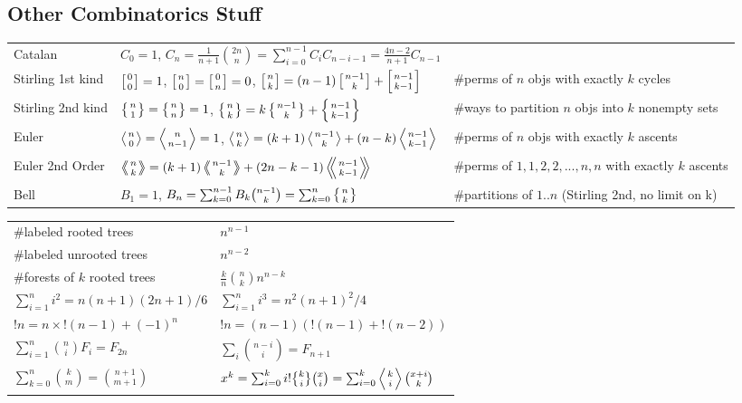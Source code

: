 \documentclass[8pt,a4paper,landscape,oneside]{amsart}
\DeclareRobustCommand{\stirling}{\genfrac\{\}{0pt}{}}
\begin{document}
\begin{multicols*}{3}
\section{Other Combinatorics Stuff}
  \begin{tabular}{@{}l|l|l@{}}
  \toprule
  Catalan	&	$C_0=1$, $C_n=\frac{1}{n+1}\binom{2n}{n} = \sum_{i=0}^{n-1}C_iC_{n-i-1} = \frac{4n-2}{n+1}C_{n-1}$  & \\
  Stirling 1st kind & $\left[{0\atop 0}\right]=1$, $\left[{n\atop 0}\right]=\left[{0\atop n}\right]=0$, $\left[{n\atop k}\right]=(n-1)\left[{n-1\atop k}\right]+\left[{n-1\atop k-1}\right]$ & \#perms of $n$ objs with exactly $k$ cycles\\
  Stirling 2nd kind & $\left\{{n\atop 1}\right\}=\left\{{n\atop n}\right\}=1$, $\left\{{n\atop k}\right\} = k \left\{{ n-1 \atop k }\right\} + \left\{{n-1\atop k-1}\right\}$ & \#ways to partition $n$ objs into $k$ nonempty sets\\
  Euler	& $\left \langle {n\atop 0} \right \rangle = \left \langle {n\atop n-1} \right \rangle = 1 $, $\left \langle {n\atop k} \right \rangle = (k+1) \left \langle {n-1\atop {k}} \right \rangle + (n-k)\left \langle {{n-1}\atop {k-1}} \right \rangle$ & \#perms of $n$ objs with exactly $k$ ascents \\
  Euler 2nd Order &  $\left \langle \!\!\left \langle {n\atop k} \right \rangle \!\! \right \rangle = (k+1) \left \langle \!\! \left \langle {{n-1}\atop {k}} \right \rangle \!\! \right \rangle +(2n-k-1)\left \langle \!\! \left \langle {{n-1}\atop {k-1}} \right \rangle  \!\! \right \rangle$ & \#perms of ${1,1,2,2,...,n,n}$ with exactly $k$ ascents \\
  Bell & $B_1 = 1$, $B_n = \sum_{k=0}^{n-1} B_k \binom{n-1}{k} = \sum_{k=0}^n\left\{{n\atop k}\right\}$ & \#partitions of $1..n$ (Stirling 2nd, no limit on k)\\
  \bottomrule
  \end{tabular}

  \vspace{10pt}
  \begin{tabular}{ll}
    \#labeled rooted trees & $n^{n-1}$ \\
    \#labeled unrooted trees & $n^{n-2}$ \\
    \#forests of $k$ rooted trees & $\frac{k}{n}\binom{n}{k}n^{n-k}$ \\
    $\sum_{i=1}^n i^2 = n(n+1)(2n+1)/6$ & $\sum_{i=1}^n i^3 = n^2(n+1)^2/4$ \\
    $!n = n\times!(n-1)+(-1)^n$ & $!n = (n-1)(!(n-1)+!(n-2))$ \\
    $\sum_{i=1}^n \binom{n}{i} F_i = F_{2n}$ & $\sum_{i} \binom{n-i}{i} = F_{n+1}$ \\
    $\sum_{k=0}^n \binom{k}{m} = \binom{n+1}{m+1}$ & $x^k = \sum_{i=0}^k i!\stirling{k}{i}\binom{x}{i} = \sum_{i=0}^k \left\langle {k \atop i} \right\rangle\binom{x+i}{k}$ \\


\end{tabular}
\end{multicols*}
\end{document}
